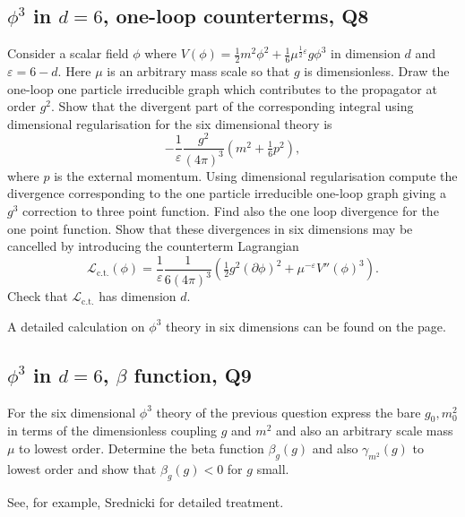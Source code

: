 \subsection{$\phi^3$ in $d=6$, one-loop counterterms, Q8}
Consider a scalar field $\phi$ where $V(\phi) = \tfrac{1}{2}m^2\phi^2 + \tfrac{1}{6}\mu^{\frac{1}{2}\varepsilon}g\phi^3$ in dimension $d$ and $\varepsilon = 6-d$. Here $\mu$ is an arbitrary mass scale so that $g$ is dimensionless. Draw the one-loop one particle irreducible graph which contributes to the propagator at order $g^2$. Show that the divergent part of the corresponding integral using dimensional regularisation for the six dimensional theory is
\begin{equation}
    -\frac{1}{\varepsilon}\frac{g^2}{(4\pi)^3}\!\left(m^2 + \tfrac{1}{6}p^2\right),
\end{equation}
where $p$ is the external momentum. Using dimensional regularisation compute the divergence corresponding to the one particle irreducible one-loop graph giving a $g^3$ correction to three point function. Find also the one loop divergence for the one point function. Show that these divergences in six dimensions may be cancelled by introducing the counterterm Lagrangian
\begin{equation}
    \mathcal{L}_{\text{c.t.}}(\phi) = \frac{1}{\varepsilon}\frac{1}{6(4\pi)^3}\!\left(\tfrac{1}{2}g^2(\partial\phi)^2 + \mu^{-\varepsilon}V''(\phi)^3\right).
\end{equation}
Check that $\mathcal{L}_{\text{c.t.}}$ has dimension $d$.
\begin{solution}
    A detailed calculation on $\phi^3$ theory in six dimensions can be found on the page.
\end{solution}

\subsection{$\phi^3$ in $d=6$, $\beta$ function, Q9}
For the six dimensional $\phi^3$ theory of the previous question express the bare $g_0, m_0^2$ in terms of the dimensionless coupling $g$ and $m^2$ and also an arbitrary scale mass $\mu$ to lowest order. Determine the beta function $\beta_g(g)$ and also $\gamma_{m^2}(g)$ to lowest order and show that $\beta_g(g) < 0$ for $g$ small.
\begin{solution}
    See, for example, Srednicki for detailed treatment.
\end{solution}

